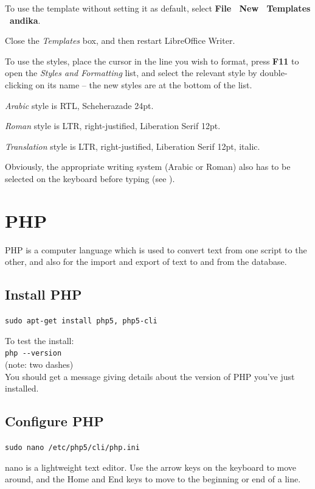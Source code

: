 \documentclass[a4paper,10pt, oneside]{book}
\begin{document}
To use the template without setting it as default, select \textbf{File \textrightarrow\ New \textrightarrow\ Templates \textrightarrow\ andika}.

Close the \textit{Templates} box, and then restart LibreOffice Writer.

To use the styles, place the cursor in the line you wish to format, press \textbf{F11} to open the \textit{Styles and Formatting} list, and select the relevant style by double-clicking on its name -- the new styles are at the bottom of the list.

\textit{Arabic} style is RTL, Scheherazade 24pt.

\textit{Roman} style is LTR, right-justified, Liberation Serif 12pt.

\textit{Translation} style is LTR, right-justified, Liberation Serif 12pt, italic.  

Obviously, the appropriate writing system (Arabic or Roman) also has to be selected on the keyboard before typing (see ).


\section{PHP}

PHP is a computer language which is used to convert text from one script to the other, and also for the import and export of text to and from the database.

\subsection{Install PHP}

\verb|sudo apt-get install php5, php5-cli|

To test the install:\\
\verb|php --version|\\
(note: two dashes)\\
You should get a message giving details about the version of PHP you've just installed.

\subsection{Configure PHP}

\verb|sudo nano /etc/php5/cli/php.ini|

nano is a lightweight text editor.  Use the arrow keys on the keyboard to move around, and the Home and End keys to move to the beginning or end of a line.
\end{document}
